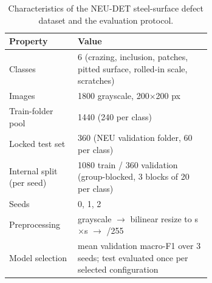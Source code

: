 \begin{table}[htbp]
\centering
\caption{Characteristics of the NEU-DET steel-surface defect dataset and the evaluation protocol.}
\label{tab:dataset}
\begin{tabular}{lp{0.66\linewidth}}
\toprule
\textbf{Property} & \textbf{Value} \\
\midrule
Classes & 6 (crazing, inclusion, patches, pitted surface, rolled-in scale, scratches) \\
Images & 1800 grayscale, 200$\times$200 px \\
Train-folder pool & 1440 (240 per class) \\
Locked test set & 360 (NEU validation folder, 60 per class) \\
Internal split (per seed) & 1080 train / 360 validation (group-blocked, 3 blocks of 20 per class) \\
Seeds & 0, 1, 2 \\
Preprocessing & grayscale $\rightarrow$ bilinear resize to s$\times$s $\rightarrow$ /255 \\
Model selection & mean validation macro-F1 over 3 seeds; test evaluated once per selected configuration \\
\bottomrule
\end{tabular}
\end{table}
